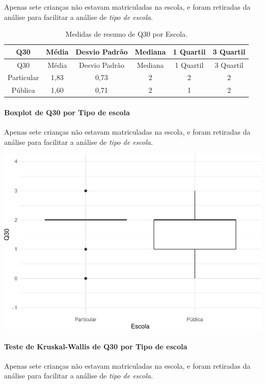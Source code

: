 \documentclass[]{article}
\let\oldparagraph\paragraph
\renewcommand{\paragraph}[1]{\oldparagraph{#1}\mbox{}}
\begin{document}
Apenas sete crianças não estavam matriculadas na escola, e foram retiradas da análise para facilitar a análise de \emph{tipo de escola}.

\begin{longtable}[]{@{}cccccc@{}}
\caption{\label{tab:unnamed-chunk-1001}Medidas de resumo de Q30 por Escola.}\tabularnewline
\toprule
Q30 & Média & Desvio Padrão & Mediana & 1 Quartil & 3 Quartil\tabularnewline
\midrule
\endfirsthead
\toprule
Q30 & Média & Desvio Padrão & Mediana & 1 Quartil & 3 Quartil\tabularnewline
\midrule
\endhead
Particular & 1,83 & 0,73 & 2 & 2 & 2\tabularnewline
Pública & 1,60 & 0,71 & 2 & 1 & 2\tabularnewline
\bottomrule
\end{longtable}

\hypertarget{boxplot-de-q30-por-tipo-de-escola}{%
\paragraph{Boxplot de Q30 por Tipo de escola}\label{boxplot-de-q30-por-tipo-de-escola}}

Apenas sete crianças não estavam matriculadas na escola, e foram retiradas da análise para facilitar a análise de \emph{tipo de escola}.

\begin{center}\includegraphics[width=0.75\linewidth]{relatorio_covid19_files/figure-latex/unnamed-chunk-1002-1} \end{center}

\hypertarget{teste-de-kruskal-wallis-de-q30-por-tipo-de-escola}{%
\paragraph{Teste de Kruskal-Wallis de Q30 por Tipo de escola}\label{teste-de-kruskal-wallis-de-q30-por-tipo-de-escola}}

Apenas sete crianças não estavam matriculadas na escola, e foram retiradas da análise para facilitar a análise de \emph{tipo de escola}.
\end{document}
